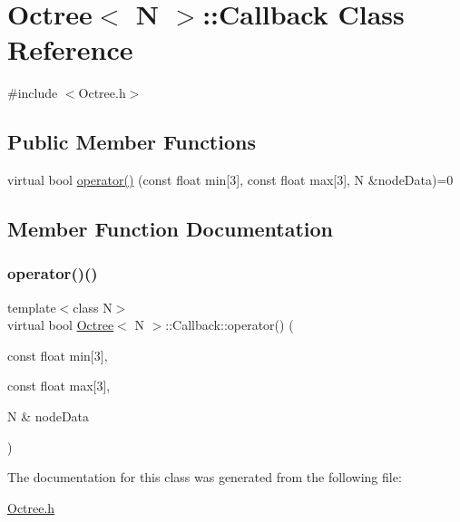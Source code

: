 \hypertarget{classOctree_1_1Callback}{}\section{Octree$<$ N $>$\+:\+:Callback Class Reference}
\label{classOctree_1_1Callback}


{\ttfamily \#include $<$Octree.\+h$>$}

\subsection*{Public Member Functions}
\begin{DoxyCompactItemize}
\item 
virtual bool \hyperlink{classOctree_1_1Callback_a0d944e37207b2171d3f014912fe2f1f9}{operator()} (const float min\mbox{[}3\mbox{]}, const float max\mbox{[}3\mbox{]}, N \&node\+Data)=0
\end{DoxyCompactItemize}


\subsection{Member Function Documentation}
\mbox{\label{classOctree_1_1Callback_a0d944e37207b2171d3f014912fe2f1f9}} 
\subsubsection{\texorpdfstring{operator()()}{operator()()}}
{\footnotesize\ttfamily template$<$class N$>$ \\
virtual bool \hyperlink{classOctree}{Octree}$<$ N $>$\+::Callback\+::operator() (\begin{DoxyParamCaption}\item[{const float}]{min\mbox{[}3\mbox{]},  }\item[{const float}]{max\mbox{[}3\mbox{]},  }\item[{N \&}]{node\+Data }\end{DoxyParamCaption})\hspace{0.3cm}{\ttfamily [pure virtual]}}



The documentation for this class was generated from the following file\+:\begin{DoxyCompactItemize}
\item 
\hyperlink{Octree_8h}{Octree.\+h}\end{DoxyCompactItemize}
